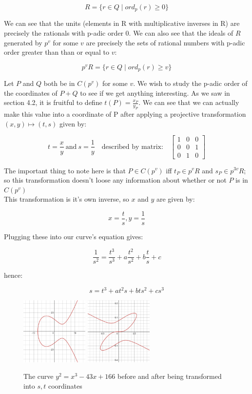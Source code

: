 \documentclass{article}
\begin{document}
\[ R = \{r \in Q \; | \; ord_p(r) \geq 0\} \]

We can see that the units (elements in R with multiplicative inverses in R) are precisely the rationals with p-adic order 0. We can also see that the ideals of $R$ generated by $p^v$ for some $v$ are precisely the sets of rational numbers with p-adic order greater than than or equal to $v$:

\[ p^vR = \{r \in Q \; | \; ord_p(r) \geq v\} \]

Let $P$ and $Q$ both be in $C(p^v)$ for some $v$. We wish to study the p-adic order of the coordinates of $P + Q$ to see if we get anything interesting. As we saw in section 4.2, it is fruitful to define $t(P) = \frac{x_P}{y_P}$. We can see that we can actually make this value into a coordinate of P after applying a projective transformation $(x, y) \mapsto (t, s)$ given by:

\[ t = \frac{x}{y} \ \text{and} \ s = \frac{1}{y} 
\quad \text{described by matrix:} \quad \begin{bmatrix}
    1 & 0 & 0\\
    0 & 0 & 1\\
    0 & 1 & 0
\end{bmatrix}
\]

The important thing to note here is that $P \in C(p^v)$ iff $t_P \in p^v R$ and $s_P \in p^{3v} R$; so this transformation doesn't loose any information about whether or not $P$ is in $C(p^v)$\\

This transformation is it's own inverse, so $x$ and $y$ are given by:

\[ x = \frac{t}{s}, y = \frac{1}{s} \]

Plugging these into our curve's equation gives:

\[ \frac{1}{s^2} = \frac{t^3}{s^3} + a \frac{t^2}{s^2} + b \frac{t}{s} + c \]

hence:

\[ s = t^3 + a t^2 s + b t s^2 + c s^3 \]

\begin{figure}
\centering
\includegraphics[width=0.3\textwidth]{desmos-graph (4).png}
\includegraphics[width=0.3\textwidth]{desmos-graph (4-1).png}
\caption{\label{fig:into curve} The curve $y^2  = x^3 - 43 x + 166$ before and after being transformed into $s, t$ coordinates}
\end{figure}
\end{document}
